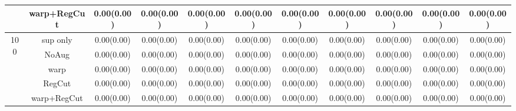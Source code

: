 \begin{table}
\begin{tabular}{c|c|ccccccccc}
&warp+RegCut&0.00(0.00)&0.00(0.00)&0.00(0.00)&0.00(0.00)&0.00(0.00)&0.00(0.00)&0.00(0.00)&0.00(0.00)&0.00(0.00)\\%
\hline%
\multirow{5}{*}{100}&sup only&0.00(0.00)&0.00(0.00)&0.00(0.00)&0.00(0.00)&0.00(0.00)&0.00(0.00)&0.00(0.00)&0.00(0.00)&0.00(0.00)\\%
&NoAug&0.00(0.00)&0.00(0.00)&0.00(0.00)&0.00(0.00)&0.00(0.00)&0.00(0.00)&0.00(0.00)&0.00(0.00)&0.00(0.00)\\%
&warp&0.00(0.00)&0.00(0.00)&0.00(0.00)&0.00(0.00)&0.00(0.00)&0.00(0.00)&0.00(0.00)&0.00(0.00)&0.00(0.00)\\%
&RegCut&0.00(0.00)&0.00(0.00)&0.00(0.00)&0.00(0.00)&0.00(0.00)&0.00(0.00)&0.00(0.00)&0.00(0.00)&0.00(0.00)\\%
&warp+RegCut&0.00(0.00)&0.00(0.00)&0.00(0.00)&0.00(0.00)&0.00(0.00)&0.00(0.00)&0.00(0.00)&0.00(0.00)&0.00(0.00)\\%
\hline%
\end{tabular}%
\end{table}